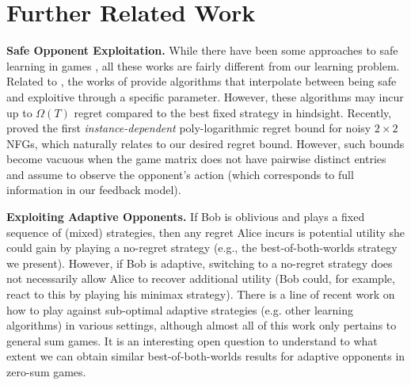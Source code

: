\section{Further Related Work} \label{app:related-work}

\textbf{Safe Opponent Exploitation.} While there have been some approaches to safe learning in games \citep{ponsen2011computing,farina2019online,zhang2021subgame,bernasconi2021exploiting,bernasconi2022safe,ge2024safe}, all these works are fairly different from our learning problem. Related to \citet{ganzfried2015safe,ganzfried2018bayesian}, the works of \citet{damer2017safely,liu2022safe} provide algorithms that interpolate between being safe and exploitive through a specific parameter. However, these algorithms may incur up to $\Omega(T)$ regret compared to the best fixed strategy in hindsight. Recently, \citet{maiti2023logarithmic} proved the first \emph{instance-dependent} poly-logarithmic regret bound for noisy $2\times2$ NFGs, which naturally relates to our desired regret bound. However, such bounds become vacuous when the game matrix does not have pairwise distinct entries and assume to observe the opponent's action (which corresponds to full information in our feedback model).

\textbf{Exploiting Adaptive Opponents.} If Bob is oblivious and plays a fixed sequence of (mixed) strategies, then any regret Alice incurs is potential utility she could gain by playing a no-regret strategy (e.g., the best-of-both-worlds strategy we present). However, if Bob is adaptive, switching to a no-regret strategy does not necessarily allow Alice to recover additional utility (Bob could, for example, react to this by playing his minimax strategy). There is a line of recent work \citep{DSSstrat, MMSSbayesian, kolumbus2022auctions, kolumbus2022and, brown2023is, cai2023selling, chen2023persuading, haghtalab2024calibrated, ananthakrishnan2024knowledge, guruganesh2024contracting, arunachaleswaran2024pareto} on how to play against sub-optimal adaptive strategies (e.g. other learning algorithms) in various settings, although almost all of this work only pertains to general sum games. It is an interesting open question to understand to what extent we can obtain similar best-of-both-worlds results for adaptive opponents in zero-sum games.

